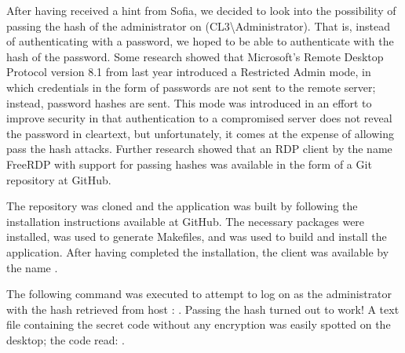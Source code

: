 After having received a hint from Sofia, we decided to look into the possibility of passing the hash of the administrator on  (CL3\textbackslash Administrator). That is, instead of authenticating with a password, we hoped to be able to authenticate with the hash of the password. Some research showed that Microsoft's Remote Desktop Protocol version 8.1 from last year introduced a Restricted Admin mode, in which credentials in the form of passwords are not sent to the remote server; instead, password hashes are sent. This mode was introduced in an effort to improve security in that authentication to a compromised server does not reveal the password in cleartext, but unfortunately, it comes at the expense of allowing pass the hash attacks\cite{portcullis_blog}. Further research showed that an RDP client by the name FreeRDP with support for passing hashes was available in the form of a Git repository at GitHub\cite{portcullis_tools}\cite{freerdp_git_repo}.

The repository was cloned and the application was built by following the installation instructions available at GitHub\cite{freerdp_installation_instructions}. The necessary packages were installed,  was used to generate Makefiles, and  was used to build and install the application. After having completed the installation, the client was available by the name .

The following command was executed to attempt to log on as the administrator with the hash retrieved from host : . Passing the hash turned out to work! A text file containing the secret code without any encryption was easily spotted on the desktop; the code read: .
